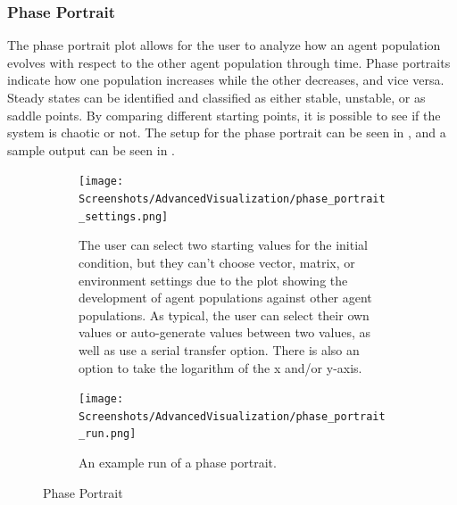 \subsubsection{Phase Portrait}
The phase portrait plot allows for the user to analyze how an agent population evolves with respect to the other agent population through time.
Phase portraits indicate how one population increases while the other decreases, and vice versa.
Steady states can be identified and classified as either stable, unstable, or as saddle points.
By comparing different starting points, it is possible to see if the system is chaotic or not.
The setup for the phase portrait can be seen in , and a sample output can be seen in . 

\begin{figure}[h!]
    \centering
    \begin{subfigure}{0.49\linewidth}
        \centering
        \vspace*{\fill}
        \texttt{[image: Screenshots/AdvancedVisualization/phase\_portrait\_settings.png]}
        \caption{
            The user can select two starting values for the initial condition, but they can't choose vector, matrix, or environment settings due to the plot showing the development of agent populations against other agent populations.
            As typical, the user can select their own values or auto-generate values between two values, as well as use a serial transfer option.
            There is also an option to take the logarithm of the x and/or y-axis. 
        }
        \label{fig:ss:av:phase_portrait_settings}
        \vspace*{\fill}
    \end{subfigure}
    \hfill
    \begin{subfigure}{0.49\linewidth}
        \centering
        \vspace*{\fill}
        \texttt{[image: Screenshots/AdvancedVisualization/phase\_portrait\_run.png]}
        \caption{
            An example run of a phase portrait.
        }
        \label{fig:ss:av:phase_portrait_run}
        \vspace*{\fill}
    \end{subfigure}
    \caption{Phase Portrait}
\end{figure}

